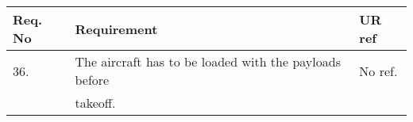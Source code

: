\begin{center}
    \begin{tabular}{ | l | p{9cm} | l |}
    \hline
    Req. No & Requirement  & UR ref \\ \hline
    36. & The aircraft has to be loaded with the payloads before& No ref.\\ &takeoff. & \\ \hline
    \end{tabular}
\end{center}
